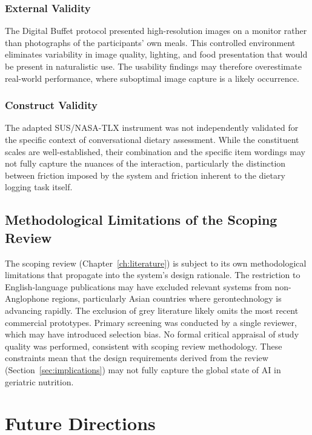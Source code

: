 \subsubsection{External Validity}
The Digital Buffet protocol presented high-resolution images on a monitor rather than photographs of the participants' own meals. This controlled environment eliminates variability in image quality, lighting, and food presentation that would be present in naturalistic use. The usability findings may therefore overestimate real-world performance, where suboptimal image capture is a likely occurrence.

\subsubsection{Construct Validity}
The adapted SUS/NASA-TLX instrument was not independently validated for the specific context of conversational dietary assessment. While the constituent scales are well-established, their combination and the specific item wordings may not fully capture the nuances of the interaction, particularly the distinction between friction imposed by the system and friction inherent to the dietary logging task itself.

\subsection{Methodological Limitations of the Scoping Review}

The scoping review (Chapter~\ref{ch:literature}) is subject to its own methodological limitations that propagate into the system's design rationale. The restriction to English-language publications may have excluded relevant systems from non-Anglophone regions, particularly Asian countries where gerontechnology is advancing rapidly. The exclusion of grey literature likely omits the most recent commercial prototypes. Primary screening was conducted by a single reviewer, which may have introduced selection bias. No formal critical appraisal of study quality was performed, consistent with scoping review methodology. These constraints mean that the design requirements derived from the review (Section~\ref{sec:implications}) may not fully capture the global state of AI in geriatric nutrition.

\section{Future Directions}
\label{sec:future-directions}

